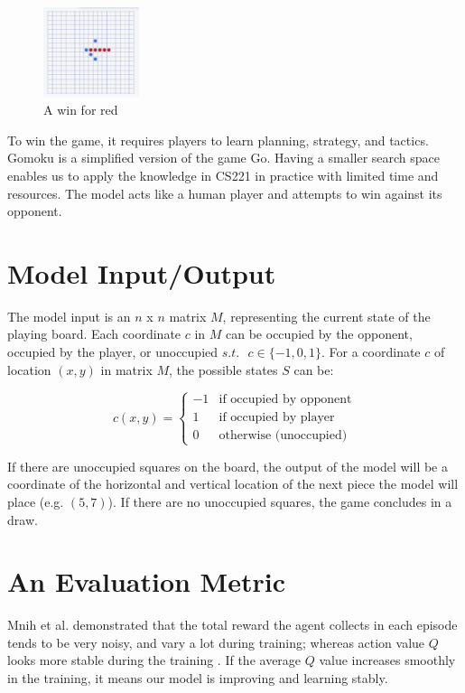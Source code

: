 \documentclass[conference]{IEEEtran}
\begin{document}
\begin{figure}[h]
    \centering
    \includegraphics[width=0.25\textwidth]{images/gomoku-win.png}
    \caption{A win for red}
    \label{gomoku-win}
\end{figure}
 
 To win the game, it requires players to learn planning, strategy, and tactics. Gomoku is a simplified version of the game Go. Having a smaller search space enables us to apply the knowledge in CS221 in practice with limited time and resources. The model acts like a human player and attempts to win against its opponent.

\section{Model Input/Output}
The model input is an $n$ x $n$ matrix $M$, representing the current state of the playing board. Each coordinate $c$ in $M$ can be occupied by the opponent, occupied by the player, or unoccupied $s.t. \text{ }c \in \{-1, 0, 1 \}$. For a coordinate $c$ of location $(x, y)$ in matrix $M$, the possible states $S$ can be:

\[
    c(x, y) =
\begin{cases}
    -1 & \text{if occupied by opponent}\\
    1  &\text{if occupied by player}\\
    0  & \text{otherwise (unoccupied)}
\end{cases}
\]

If there are unoccupied squares on the board, the output of the model will be a coordinate of the horizontal and vertical location of the next piece the model will place (e.g. $(5, 7)$). If there are no unoccupied squares, the game concludes in a draw.

\section{An Evaluation Metric}
Mnih et al. demonstrated that the total reward the agent collects in each episode tends to be very noisy, and vary a lot during training; whereas action value $Q$ looks more stable during the training \cite{b1}. If the average $Q$ value increases smoothly in the training, it means our model is improving and learning stably.
\end{document}
